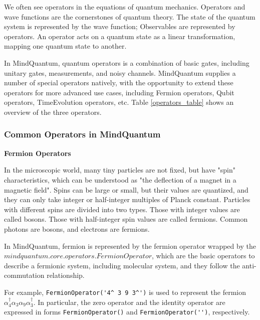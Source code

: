 

We often see operators in the equations of quantum mechanics. Operators and wave functions are the cornerstones of quantum theory. The state of the quantum system is represented by the wave function; Observables are represented by operators. An operator acts on a quantum state as a linear transformation, mapping one quantum state to another.

In MindQuantum, quantum operators is a combination of basic gates, including unitary gates, measurements, and noisy channels. MindQuantum supplies a number of special operators natively, with the opportunity to extend these operators for more advanced use cases, including Fermion operators, Qubit operators, TimeEvolution operators, etc. Table \ref{operators_table} shows an overview of the three operators.


\subsubsection{Common Operators in MindQuantum}
\textbf{Fermion Operators}

In the microscopic world, many tiny particles are not fixed, but have "spin" characteristics, which can be understood as "the deflection of a magnet in a magnetic field". Spins can be large or small, but their values are quantized, and they can only take integer or half-integer multiples of Planck constant. Particles with different spins are divided into two types. Those with integer values are called bosons. Those with half-integer spin values are called fermions. Common photons are bosons, and electrons are fermions.

In MindQuantum, fermion is represented by the fermion operator wrapped by the $mindquantum.core.operators.FermionOperator$, which are the basic operators to describe a fermionic system, including molecular system, and they follow the anti-commutation relationship.

For example, \verb|FermionOperator('4^ 3 9 3^')| is used to represent the fermion $\alpha_4^\dagger \alpha_3 \alpha_9 \alpha_3^\dagger$. In particular, the zero operator and the identity operator are expressed in forms \verb|FermionOperator()| and \verb|FermionOperator('')|, respectively.

